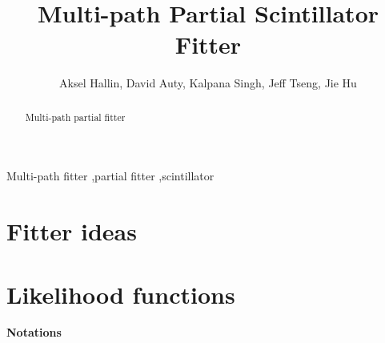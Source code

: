 \documentclass[preprint,12pt]{elsarticle}
\begin{document}
\begin{frontmatter}



\title{Multi-path Partial Scintillator Fitter}


\author{Aksel Hallin, David Auty, Kalpana Singh, Jeff Tseng, Jie Hu}

\address{University of Alberta}

\begin{abstract}
 Multi-path partial fitter

\end{abstract}

\begin{keyword}
Multi-path fitter \sep partial fitter \sep scintillator

\end{keyword}

\end{frontmatter}


\section{Fitter ideas}


\section{Likelihood functions}
\textbf{Notations}
\end{document}
